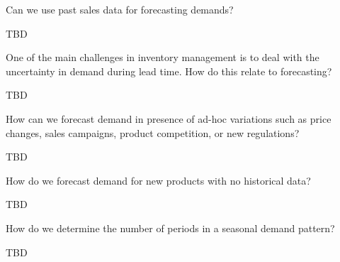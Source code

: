 \begin{question}
Can we use past sales data for forecasting demands?

  \begin{solution}
    TBD
    
  \end{solution}
\end{question}


\begin{question}
One of the main challenges in inventory management is to deal with the uncertainty in demand during lead time. How do this relate to forecasting?


  \begin{solution}
  TBD
%
    
  \end{solution}
\end{question}

\begin{question}
How can we forecast demand in presence of ad-hoc variations such as price changes, sales campaigns, product competition, or new regulations?

  \begin{solution}
    TBD
    
  \end{solution}
\end{question}

\begin{question}
How do we forecast demand for new products with no historical data?

  \begin{solution}
    TBD
    
  \end{solution}
\end{question}

\begin{question}
How do we determine the number of periods in a seasonal demand pattern? 

  \begin{solution}
    TBD
    
  \end{solution}
\end{question}



